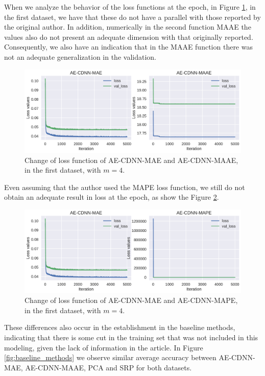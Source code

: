 \newpage

When we analyze the behavior of the loss functions at the epoch, in Figure \ref{fig:change_loss_mae_maae}, in the first dataset, we have that these do not have a parallel with those reported by the original author. In addition, numerically in the second function MAAE the values also do not present an adequate dimension with that originally reported. Consequently, we also have an indication that in the MAAE function there was not an adequate generalization in the validation.


\begin{figure}[!ht]
\centering
\includegraphics[width=0.8\linewidth]{figure/change_loss_mae_maae.pdf}
    \caption{Change of loss function of AE-CDNN-MAE and AE-CDNN-MAAE, in the first dataset, with $m=4$.}
\label{fig:change_loss_mae_maae}
\end{figure}


Even assuming that the author used the MAPE loss function, we still do not obtain an adequate result in loss at the epoch, as show the Figure \ref{fig:change_loss_mae_mape}.

\begin{figure}[!ht]
\centering
\includegraphics[width=0.8\linewidth]{figure/change_loss_mae_mape.pdf}
    \caption{Change of loss function of AE-CDNN-MAE and AE-CDNN-MAPE, in the first dataset, with $m=4$.}
\label{fig:change_loss_mae_mape}
\end{figure}


These differences also occur in the establishment in the baseline methods, indicating that there is some cut in the training set that was not included in this modeling, given the lack of information in the article. In Figure \ref{fig:baseline_methods} we observe similar average accuracy between AE-CDNN-MAE, AE-CDNN-MAAE, PCA and SRP for both datasets. 


